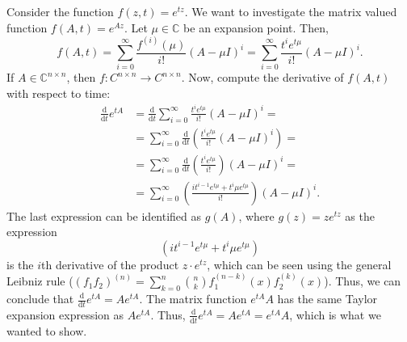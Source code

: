Consider the function $f(z,t) = e^{tz}$. We want to investigate the matrix valued function $f(A,t) = e^{Az}$. Let $\mu \in \mathbb{C}$ be an expansion point. Then,
\begin{equation}
  f(A,t) = \sum\limits_{i = 0}^{\infty} \frac{f^{(i)}(\mu)}{i!}(A-\mu I)^{i} = \sum\limits_{i = 0}^{\infty} \frac{t^ie^{t\mu}}{i!}(A-\mu I)^{i}.
\end{equation}
If $A\in\mathbb{C}^{n\times n}$, then $f:C^{n \times n}\rightarrow C^{n \times n}$. Now, compute the derivative of $f(A,t)$ with respect to time: 
\begin{equation}
\begin{aligned}
\frac{\mathrm d}{\mathrm d t}e^{tA} & = \frac{\mathrm d}{\mathrm dt}\sum^{\infty}_{i = 0} \frac{t^ie^{t\mu}}{i!}(A-\mu I )^i = \\
& = \sum^{\infty}_{i = 0} \frac{\mathrm d}{\mathrm dt}\left(\frac{t^ie^{t\mu}}{i!}(A-\mu I )^i\right) = \\
& = \sum^{\infty}_{i = 0} \frac{\mathrm d}{\mathrm dt}\left(\frac{t^ie^{t\mu}}{i!}\right)(A-\mu I )^i  = \\
&= \sum^{\infty}_{i = 0}  \left(\frac{it^{i-1}e^{t\mu}+t^i\mu e^{t\mu}}{i!}\right) (A-\mu I )^i.
\end{aligned}
\end{equation}
The last expression can be identified as $g(A)$, where $g(z) = ze^{tz}$ as  the expression
\begin{equation}
\left(it^{i-1}e^{t\mu}+t^i\mu e^{t\mu}\right)
\end{equation}
is the $i$th derivative of the product $z\cdot e^{tz}$, which can be seen using the general Leibniz rule ($(f_1f_2)^{(n)} = \sum_{k = 0}^n\binom{n}{k}f_1^{(n-k)}(x)f_2^{(k)}(x)$). Thus, we can conclude that $\frac{\mathrm d }{\mathrm dt}e^{tA} = Ae^{tA}$. The matrix function $e^{tA}A$ has the same Taylor expansion expression as $Ae^{tA}$. Thus, $\frac{\mathrm d }{\mathrm dt}e^{tA} = Ae^{tA} = e^{tA} A$, which is what we wanted to show.






